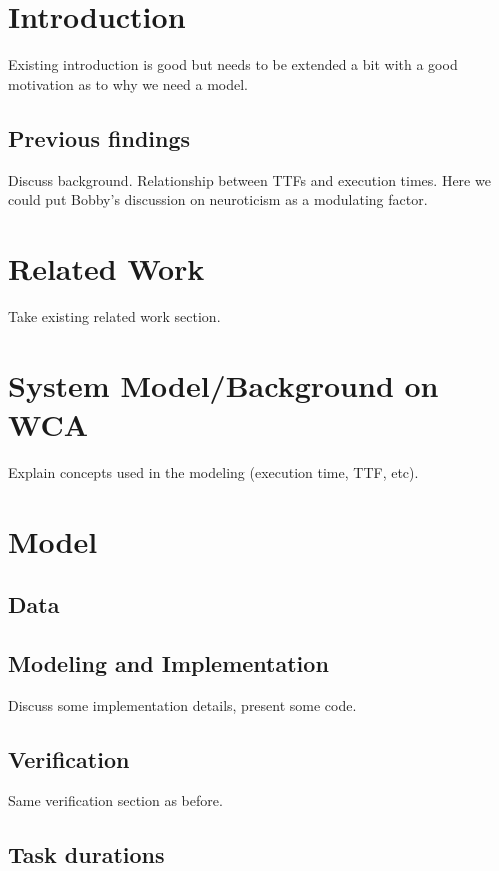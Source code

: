\section{Introduction}
Existing introduction is good but needs to be extended a bit with a good motivation as to why we need a model.

\subsection{Previous findings}

Discuss background.
Relationship between TTFs and execution times.
Here we could put Bobby's discussion on neuroticism as a modulating factor.

\section{Related Work}

Take existing related work section.

\section{System Model/Background on WCA}

Explain concepts used in the modeling (execution time, TTF, etc).

\section{Model}

\subsection{Data}

\subsection{Modeling and Implementation}

Discuss some implementation details, present some code.

\subsection{Verification}

Same verification section as before.

\subsection{Task durations}

